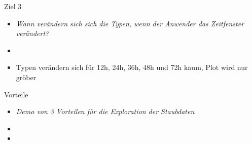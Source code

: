 \documentclass{beamer}
\begin{document}
    \begin{frame}{Ziel 3}
    	\begin{itemize}
    		\setlength\itemsep{1em}
    		\item[] \textit{Wann verändern sich sich die Typen, wenn der Anwender das Zeitfenster verändert?}
    		\item[]
    		\item Typen verändern sich für 12h, 24h, 36h, 48h und 72h kaum, Plot wird nur gröber
    	\end{itemize}
    \end{frame}
    
    \begin{frame}{Vorteile}
    	\begin{itemize}
    		\setlength\itemsep{1em}
    		\item[] \textit{Demo von 3 Vorteilen für die Exploration der Staubdaten}
    		\item[]
    		\item
    	\end{itemize}
    \end{frame}
    
\end{document}
